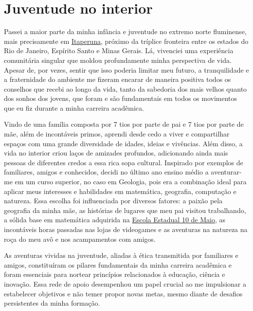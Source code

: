 \documentclass[10pt,a4paper,oneside]{book}
\begin{document}
\section{Juventude no interior}

Passei a maior parte da minha infância e juventude no extremo norte fluminense, mais precisamente em \href{https://www.itaperuna.rj.gov.br/pmi/}{Itaperuna}, próximo da tríplice fronteira entre os estados do Rio de Janeiro, Espírito Santo e Minas Gerais. Lá, vivenciei uma experiência comunitária singular que moldou profundamente minha perspectiva de vida. Apesar de, por vezes, sentir que isso poderia limitar meu futuro, a tranquilidade e a fraternidade do ambiente me fizeram encarar de maneira positiva todos os conselhos que recebi ao longo da vida, tanto da sabedoria dos mais velhos quanto dos sonhos dos jovens, que foram e são fundamentais em todos os movimentos que eu fiz durante a minha carreira acadêmica.

Vindo de uma família composta por 7 tios por parte de pai e 7 tios por parte de mãe, além de incontáveis primos, aprendi desde cedo a viver e compartilhar espaços com uma grande diversidade de idades, ideias e vivências. Além disso, a vida no interior criou laços de amizades profundos, adicionando ainda mais pessoas de diferentes credos a essa rica sopa cultural. Inspirado por exemplos de familiares, amigos e conhecidos, decidi no último ano ensino médio a aventurar-me em um curso superior, no caso em Geologia, pois era a combinação ideal para aplicar meus interesses e habilidades em matemática, geografia, computação e natureza. Essa escolha foi influenciada por diversos fatores: a paixão pela geografia da minha mãe, as histórias de lugares que meu pai visitou trabalhando, a sólida base em matemática adquirida na \href{https://qedu.org.br/escola/33001286-ce-dez-de-maio}{Escola Estadual 10 de Maio}, as incontáveis horas passadas nas lojas de videogames e as aventuras na natureza na roça do meu avô e nos acampamentos com amigos.

As aventuras vividas na juventude, aliadas à ética transmitida por familiares e amigos, constituíram os pilares fundamentais da minha carreira acadêmica e foram essenciais para nortear princípios relacionados à educação, ciência e inovação. Essa rede de apoio desempenhou um papel crucial ao me impulsionar a estabelecer objetivos e não temer propor novas metas, mesmo diante de desafios persistentes da minha formação.

\end{document}
